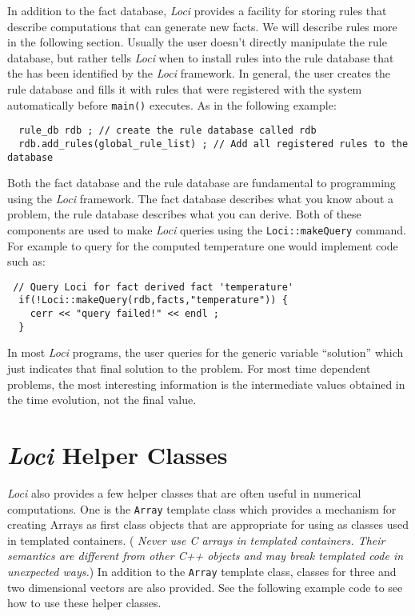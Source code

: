 \documentclass[10pt,epsf]{book}
\begin{document}
In addition to the fact database, {\it Loci} provides a facility for storing
rules that describe computations that can generate new facts.  We will
describe rules more in the following section.  Usually the user
doesn't directly manipulate the rule database, but rather tells {\it Loci}
when to install rules into the rule database that the has been
identified by the {\it Loci} framework.  In general, the user creates the
rule database and fills it with rules that were registered with the
system automatically before {\tt main()} executes.  As in the
following example:
\begin{verbatim}
  rule_db rdb ; // create the rule database called rdb
  rdb.add_rules(global_rule_list) ; // Add all registered rules to the database
\end{verbatim}
Both the fact database and the rule database are fundamental to
programming using the {\it Loci} framework.  The fact database describes
what you know about a problem, the rule database describes what you
can derive.  Both of these components are used to make {\it Loci} queries
using the {\tt Loci::makeQuery} command.  For example to query for the
computed temperature one would implement code such as:
\begin{verbatim}
 // Query Loci for fact derived fact 'temperature'
  if(!Loci::makeQuery(rdb,facts,"temperature")) {
    cerr << "query failed!" << endl ;
  }
\end{verbatim}
In most {\it Loci} programs, the user queries for the generic variable
``solution'' which just indicates that final solution to the problem.
For most time dependent problems, the most interesting information is
the intermediate values obtained in the time evolution, not the final
value.


\section{{\it Loci} Helper Classes}

{\it Loci} also provides a few helper classes that are often useful in
numerical computations.  One is the {\tt Array} template class which provides a
mechanism for creating Arrays as first class objects that are
appropriate for using as classes used in templated containers. ({\it
Never use C arrays in templated containers.  Their semantics are
different from other C++ objects and may break templated code in
unexpected ways.})  In addition to the {\tt Array} template class,
classes for three and two dimensional vectors are also provided.  See
the following example code to see how to use these helper classes.
\end{document}

